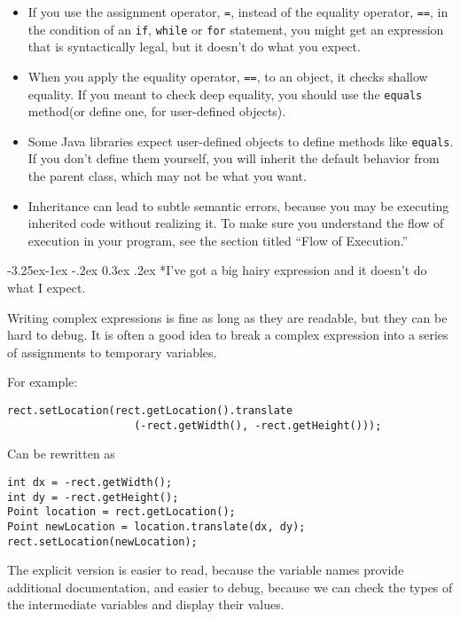 \documentclass{book}
\makeatletter
\renewcommand\subsection{\@startsection {subsection}{2}{0mm}%
    {-3.25ex\@plus -1ex \@minus -.2ex}%
    {0.3ex \@plus .2ex}%
    {\normalfont\large\bfseries}}
\makeatother
\begin{document}
\begin{itemize}

\item If you use the assignment operator,
{\tt =}, instead of the equality operator, {\tt ==}, in the
condition of an {\tt if}, {\tt while} or {\tt for} statement,
you might get an expression that is syntactically legal, but
it doesn't do what you expect.

\item When you apply the equality operator, {\tt ==}, to an
object, it checks shallow equality.  If you meant to check
deep equality, you should use the {\tt equals} method(or
define one, for user-defined objects).

\item Some Java libraries expect user-defined objects to
define methods like {\tt equals}.  If you don't define them
yourself, you will inherit the default behavior from the parent
class, which may not be what you want.

\item Inheritance can lead to subtle semantic errors,
because you may be executing inherited code without realizing it.
To make sure you understand the flow of execution in your
program, see the section titled ``Flow of Execution.''

\end{itemize}


\subsection*{I've got a big hairy expression and it doesn't
do what I expect.}

Writing complex expressions is fine as long as they are readable,
but they can be hard to debug.  It is often a good idea to
break a complex expression into a series of assignments to
temporary variables.

For example:

\begin{verbatim}
rect.setLocation(rect.getLocation().translate
                    (-rect.getWidth(), -rect.getHeight()));
\end{verbatim}
%
Can be rewritten as

\begin{verbatim}
int dx = -rect.getWidth();
int dy = -rect.getHeight();
Point location = rect.getLocation();
Point newLocation = location.translate(dx, dy);
rect.setLocation(newLocation);
\end{verbatim}
%
The explicit version is easier to read, because the variable
names provide additional documentation, and easier to debug,
because we can check the types of the intermediate variables
and display their values.
\end{document}
